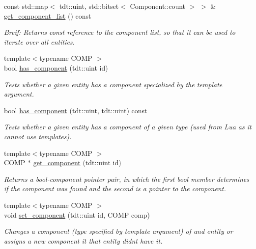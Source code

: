 \begin{DoxyCompactItemize}
const std\+::map$<$ tdt\+::uint, std\+::bitset$<$ Component\+::count $>$ $>$ \& \hyperlink{class_entity_system_aaa1035152c890ca73f47d300d6377498}{get\+\_\+component\+\_\+list} () const 
\begin{DoxyCompactList}\small\item\em Breif\+: Returns const reference to the component list, so that it can be used to iterate over all entities. \end{DoxyCompactList}\item 
{\footnotesize template$<$typename C\+O\+MP $>$ }\\bool \hyperlink{class_entity_system_a0f079d475b904a1a48bce63b4c7d64cd}{has\+\_\+component} (tdt\+::uint id)
\begin{DoxyCompactList}\small\item\em Tests whether a given entity has a component specialized by the template argument. \end{DoxyCompactList}\item 
bool \hyperlink{class_entity_system_a80122f961940fce5ce2493966770b234}{has\+\_\+component} (tdt\+::uint, tdt\+::uint) const 
\begin{DoxyCompactList}\small\item\em Tests whether a given entity has a component of a given type (used from Lua as it cannot use templates). \end{DoxyCompactList}\item 
{\footnotesize template$<$typename C\+O\+MP $>$ }\\C\+O\+MP $\ast$ \hyperlink{class_entity_system_ad9610ae9a595fc16e8f545cf752ee4f0}{get\+\_\+component} (tdt\+::uint id)
\begin{DoxyCompactList}\small\item\em Returns a bool-\/component pointer pair, in which the first bool member determines if the component was found and the second is a pointer to the component. \end{DoxyCompactList}\item 
{\footnotesize template$<$typename C\+O\+MP $>$ }\\void \hyperlink{class_entity_system_aea3df5c0dc93e72513914cdbbeb2a613}{set\+\_\+component} (tdt\+::uint id, C\+O\+MP comp)
\begin{DoxyCompactList}\small\item\em Changes a component (type specified by template argument) of and entity or assigns a new component it that entity didn\textquotesingle{}t have it. \end{DoxyCompactList}\item 

\end{DoxyCompactItemize}

